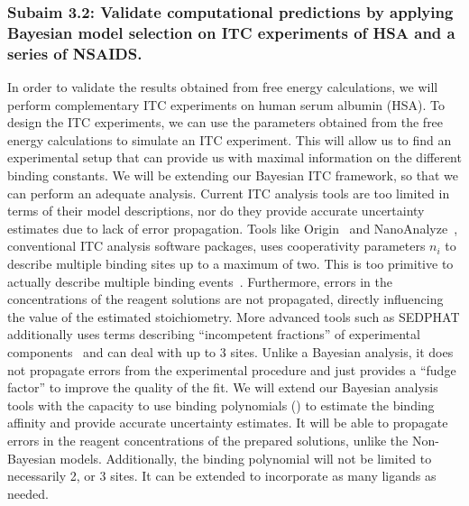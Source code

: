\documentclass[10pt,final]{article}
\begin{document}
\subsubsection*{Subaim 3.2: Validate computational predictions by applying Bayesian model selection on ITC  experiments of HSA and a series of NSAIDS.}
In order to validate the results obtained from free energy calculations, we will perform complementary ITC experiments on human serum albumin (HSA). 
%
To design the ITC experiments, we can use the parameters obtained from the free energy calculations to simulate an ITC experiment.
%
This will allow us to find an experimental setup that can provide us with maximal information on the different binding constants.
%
We will be extending our Bayesian ITC framework, so that we can perform an adequate analysis. 
%
Current ITC analysis tools are too limited in terms of their model descriptions, nor do they provide accurate uncertainty estimates due to lack of error propagation.
%
Tools like Origin~\autocite{MicroCal2004a} and NanoAnalyze~\autocite{NanoAnalyze2014a}, conventional ITC analysis software packages, uses cooperativity parameters $n_i$ to describe multiple binding sites up to a maximum of two.
%
This is too primitive to actually describe multiple binding events~\autocite{Klotz1997a}.
%
Furthermore, errors in the concentrations of the reagent solutions are not propagated, directly influencing the value of the estimated stoichiometry.
%
More advanced tools such as SEDPHAT additionally uses terms describing ``incompetent fractions'' of experimental components~\autocite{Houtman2007a,Zhao2015b} and can deal with up to 3 sites.
%
Unlike a Bayesian analysis, it does not propagate errors from the experimental procedure and just provides a ``fudge factor'' to improve the quality of the fit.
%
We will extend our Bayesian analysis tools with the capacity to use binding polynomials () to estimate the binding affinity and provide accurate uncertainty estimates.
%
It will be able to propagate errors in the reagent concentrations of the prepared solutions, unlike the Non-Bayesian models.
%
Additionally, the binding polynomial will not be limited to necessarily 2, or 3 sites. 
%
It can be extended to incorporate as many ligands as needed.
%
\end{document}
